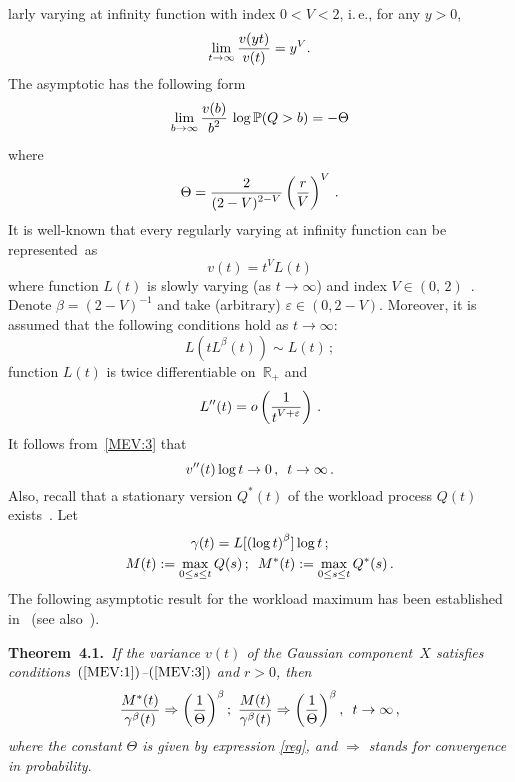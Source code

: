 \begin{multicols}{2}
\noindent
larly varying at infinity function with index $0<V<2$, i.\,e.,
for any $y>0$,
$$
\lim_{t \to \infty} \displaystyle\frac{\displaystyle v(yt) \mathstrut}{\displaystyle v(t)\mathstrut}=y^V.
$$
The asymptotic has the following form~\cite{Debicki2, Duffy}
\begin{equation*}
\lim_{b \to \infty} \displaystyle\frac{\displaystyle v(b)\mathstrut}{\displaystyle b^2\mathstrut} \,\log \mathbb{P}(Q>b)=-\Theta
\end{equation*}
where
\begin{eqnarray}
\Theta=\displaystyle\frac{\displaystyle 2\mathstrut}{\displaystyle (2-V)^{2-V}\mathstrut}\left( \displaystyle\frac{\displaystyle r\mathstrut}{\displaystyle V\mathstrut} \right)^V\,.
\label{reg}
\end{eqnarray}
It is well-known that every regularly varying at infinity function can be
represented~as
\begin{equation}
v(t)=t^V L(t)
\label{MEV:1}
\end{equation}
 where function $L(t)$  is slowly varying (as $t\to\infty$) and
index $V\in (0,\,2)$~\cite{Seneta}. Denote $\beta=(2-V)^{-1}$ and
take (arbitrary) $\varepsilon \in (0,2-V)$. Moreover, it is assumed
that the following conditions hold as $t \to \infty$:
\begin{equation}
L(tL^\beta(t)) \sim L(t)\,;
\label{MEV:2}
\end{equation}
 function $L(t)$ is twice differentiable on~$\mathbb{R}_+$ and
\begin{equation}
L''(t)=o\left( \displaystyle\frac{\displaystyle 1\mathstrut}{\displaystyle t^{V+\varepsilon}\mathstrut} \right)\,.
\label{MEV:3}
\end{equation}
It follows from~\eqref{MEV:3}  that
\begin{equation}
v''(t)\log t \to 0\,,\enskip t \to \infty\,.
\label{2.2.l20}
\end{equation}
Also, recall that a stationary version $Q^*(t)$ of the workload
process $Q(t)$ exists~\cite{MEV:Konstantopoulos}. Let
\begin{gather*}
\gamma(t)=L[\left(\log t \right)^\beta]  \log t \,;
\\
M(t):=\max\limits_{0 \leq s \leq t}Q(s)\,;\enskip M^*(t):=\max\limits_{0 \leq s \leq t}Q^*(s)\,.
\end{gather*}
The following asymptotic result for the workload maximum  has been
established in~\cite{Luk1} (see also~\cite{Luk3, Luk2}).

\smallskip

\noindent
\textbf{Theorem~4.1.}\
\textit{If the variance $v(t)$ of the Gaussian component~$X$ satisfies
conditions~$(\ref{MEV:1})$--$(\ref{MEV:3})$ and $r>0$, then
\begin{equation}
\frac{M^*(t)}{\gamma^\beta(t)} \Rightarrow
\left(\displaystyle\frac{\displaystyle 1\mathstrut}{\displaystyle \Theta\mathstrut}\right)^\beta;\,\,
\frac{M(t)}{\gamma^\beta(t)} \Rightarrow
\left(\displaystyle\frac{\displaystyle 1\mathstrut}{\displaystyle \Theta\mathstrut}\right)^\beta,\,\,\,t \to \infty\,,
\label{MEV:4}
\end{equation}
where the constant $\Theta$ is given by expression \eqref{reg},  and
$\Rightarrow$ stands for convergence in probability}.



\end{multicols}
